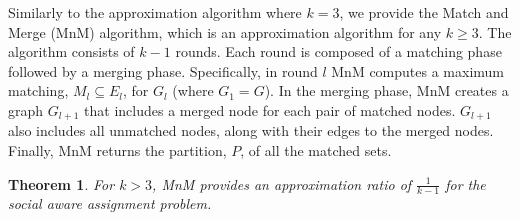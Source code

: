 \documentclass[letterpaper]{article} %
\newtheorem{theorem}{Theorem}
\begin{document}
Similarly to the approximation algorithm where $k=3$, we provide the Match and Merge (MnM) algorithm, which is an approximation algorithm for any $k \geq 3$. 
The algorithm consists of $k-1$ rounds. Each round is composed of a matching phase followed by a merging phase.
Specifically, in round $l$ MnM computes a maximum matching, $M_l \subseteq E_l$, for $G_l$ (where $G_1 = G$). In the merging phase, MnM creates a graph $G_{l+1}$ that includes a merged node for each pair of matched nodes. $G_{l+1}$ also includes all unmatched nodes, along with their edges to the merged nodes.
Finally, MnM returns the partition, $P$, of all the matched sets.
\begin{theorem}
For $k>3$, MnM provides an approximation ratio of $\frac{1}{k-1}$ for the social aware assignment problem.
\end{theorem}
\end{document}
